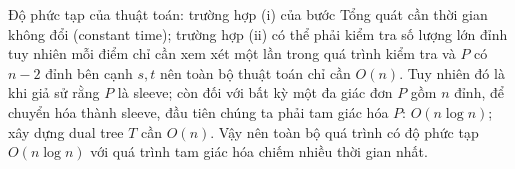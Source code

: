 Độ phức tạp của thuật toán: trường hợp (i) của bước Tổng quát cần thời gian không đổi (constant time); trường hợp (ii) có thể phải kiểm tra số lượng lớn đỉnh tuy nhiên mỗi điểm chỉ cần xem xét một lần trong quá trình kiểm tra và $P$ có $n-2$ đỉnh bên cạnh $s, t$ nên toàn bộ thuật toán chỉ cần $O\left(n\right)$. Tuy nhiên đó là khi giả sử rằng $P$ là sleeve; còn đối với bất kỳ một đa giác đơn $P$ gồm  $n$ đỉnh, để chuyển hóa thành sleeve, đầu tiên chúng ta phải tam giác hóa $P$: $O\left(n \log n \right)$; xây dựng dual tree $T$ cần $O\left(n\right)$.  Vậy nên toàn bộ quá trình có độ phức tạp $O\left(n \log n \right)$ với quá trình tam giác hóa chiếm nhiều thời gian nhất.